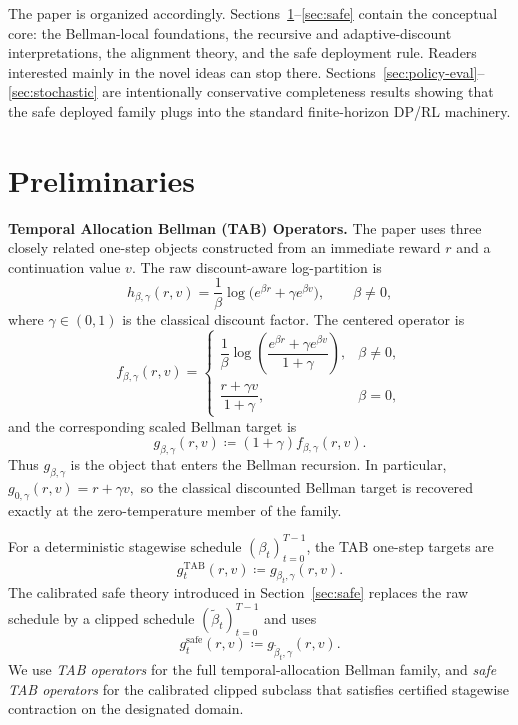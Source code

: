 \documentclass{article}
\theoremstyle{remark}
\newcommand{\defeq}{\coloneqq}
\newcommand{\fbg}{f_{\beta,\gamma}}
\newcommand{\gbg}{g_{\beta,\gamma}}
\newcommand{\safe}{\mathrm{safe}}
\begin{document}
The paper is organized accordingly. Sections~\ref{sec:prelim}--\ref{sec:safe} contain the conceptual core: the Bellman-local foundations, the recursive and adaptive-discount interpretations, the alignment theory, and the safe deployment rule. Readers interested mainly in the novel ideas can stop there. Sections~\ref{sec:policy-eval}--\ref{sec:stochastic} are intentionally conservative completeness results showing that the safe deployed family plugs into the standard finite-horizon DP/RL machinery.


\section{Preliminaries}
\label{sec:prelim}

\noindent\textbf{Temporal Allocation Bellman (TAB) Operators.}
The paper uses three closely related one-step objects constructed from an immediate reward $r$ and a continuation value $v$. The raw discount-aware log-partition is
\[
 h_{\beta,\gamma}(r,v)
 =
 \frac{1}{\beta}\log\!\bigl(e^{\beta r}+\gamma e^{\beta v}\bigr),
 \qquad \beta\neq 0,
\]
where $\gamma\in(0,1)$ is the classical discount factor. The centered operator is
\begin{equation}
\fbg(r,v)
=
\begin{cases}
\dfrac{1}{\beta}\log\!\left(\dfrac{e^{\beta r}+\gamma e^{\beta v}}{1+\gamma}\right), & \beta\neq 0,\\[1.2ex]
\dfrac{r+\gamma v}{1+\gamma}, & \beta = 0,
\end{cases}
\label{eq:weighted-lse}
\end{equation}
and the corresponding scaled Bellman target is
\begin{equation}
\gbg(r,v) \defeq (1+\gamma)\fbg(r,v).
\label{eq:weighted-target}
\end{equation}
Thus $\gbg$ is the object that enters the Bellman recursion. In particular, $g_{0,\gamma}(r,v)=r+\gamma v,$ so the classical discounted Bellman target is recovered exactly at the zero-temperature member of the family.

For a deterministic stagewise schedule $(\beta_t)_{t=0}^{T-1}$, the TAB one-step targets are
\[
g_t^{\mathrm{TAB}}(r,v) \defeq g_{\beta_t,\gamma}(r,v).
\]
The calibrated safe theory introduced in Section~\ref{sec:safe} replaces the raw schedule by a clipped schedule $(\widetilde\beta_t)_{t=0}^{T-1}$ and uses
\[
g_t^{\safe}(r,v) \defeq g_{\widetilde\beta_t,\gamma}(r,v).
\]
We use \emph{TAB operators} for the full temporal-allocation Bellman family, and \emph{safe TAB operators} for the calibrated clipped subclass that satisfies certified stagewise contraction on the designated domain.
\end{document}
